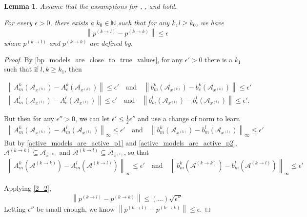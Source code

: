 \documentclass{article}
\newtheorem{lemma}[theorem]{Lemma}
\theoremstyle{case}
\numberwithin{theorem}{subsection}
\newcommand{\naturals}{\mathbb N}
\newcommand{\xk}{{x^{(k)}}}
\begin{document}
\begin{lemma}
\label{bounded_projection_theorem}
Assume that the assumptions for 
, ,  and  hold.

For every $\epsilon > 0$, there exists a $k_0 \in\naturals$ such that for any $k, l \ge k_0$, 
we have 
\begin{align*}
\left\|p^{(k\to l)} - p^{(k\to k)}\right\| \le \epsilon
\end{align*}
where 
$p^{(k\to l)}$ and $p^{(k\to k)}$ are defined by.

\end{lemma}
\begin{proof}
By \cref{bp_models_are_close_to_true_values}, for any $\epsilon' > 0$ there is a $k_1$ such that if $l,k \ge k_1$, then

\begin{align*}
\left\|A^k_m\left(\mathcal A_{\xk}\right) - A^k_c\left(\mathcal A_{\xk}\right) \right\| \le \epsilon' \quad \textrm{and} \quad
\left\|b^k_m\left(\mathcal A_{\xk}\right) - b^k_c\left(\mathcal A_{\xk}\right) \right\| \le \epsilon' \\
\left\|A^l_m\left(\mathcal A_{x^{(l)}}\right) - A^l_c\left(\mathcal A_{x^{(l)}}\right) \right\| \le \epsilon' \quad \textrm{and} \quad
\left\|b^l_m\left(\mathcal A_{x^{(l)}}\right) - b^l_c\left(\mathcal A_{x^{(l)}}\right) \right\| \le \epsilon'.
\end{align*}

But then for any $\epsilon'' > 0$, we can let $\epsilon' \le \frac 1 2 \epsilon''$ and use a change of norm to learn
\begin{align*}
\left\|A^k_m\left(\mathcal A_{\xk}\right) - A^l_m\left(\mathcal A_{x^{(l)}}\right) \right\|_{\infty} \le \epsilon' \quad \textrm{and} \quad
\left\|b^k_m\left(\mathcal A_{\xk}\right) - b^l_m\left(\mathcal A_{x^{(l)}}\right) \right\|_{\infty} \le \epsilon'
\end{align*}
But by \cref{active_models_are_active_p1} and \cref{active_models_are_active_p2}, 
$\mathcal A^{(k \to k)} \subseteq \mathcal A_{\xk}$ and $\mathcal A^{(k \to l)} \subseteq \mathcal A_{x^{(l)}}$, so that
\begin{align*}
\left\|A^k_m\left(\mathcal A^{(k \to k)} \right) - A^l_m\left(\mathcal A^{(k \to l)}\right) \right\|_{\infty} \le \epsilon' \quad \textrm{and} \quad
\left\|b^k_m\left(\mathcal A^{(k \to k)} \right) - b^l_m\left(\mathcal A^{(k \to l)}\right) \right\|_{\infty} \le \epsilon'
\end{align*}

Applying \cref{2_2}, 
\begin{align*}
\left\|p^{(k\to l)} - p^{(k\to k)}\right\| \le \left(\ldots\right) \sqrt{\epsilon''}
\end{align*}
Letting $\epsilon''$ be small enough, we know $\left\|p^{(k\to l)} - p^{(k\to k)}\right\| \le \epsilon$.
\end{proof}
\end{document}
